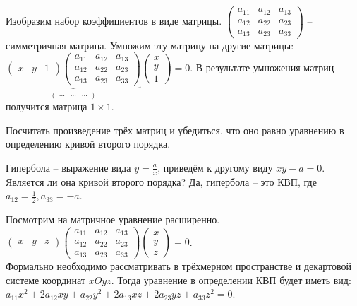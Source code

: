   Изобразим набор коэффициентов в виде матрицы.
  $\left( \begin{array}{cccc}
    a_{11} & a_{12} & a_{13}\\
    a_{12} & a_{22} & a_{23} \\
    a_{13} & a_{23} & a_{33}
    \end{array}\right)$ -- симметричная матрица.
  Умножим эту матрицу  на другие матрицы:
  $\underbrace{\left( \begin{array}{cccc}
    x & y & 1
    \end{array}\right)
  \left( \begin{array}{cccc}
    a_{11} & a_{12} & a_{13}\\
    a_{12} & a_{22} & a_{23} \\
    a_{13} & a_{23} & a_{33}
    \end{array}\right)}_
      {\left( \begin{array}{cccc}
      ... & ... & ... 
      \end{array}\right)}
  \left( \begin{array}{cccc}
    x \\
    y \\
    1
    \end{array}\right) = 0 $. В результате умножения матриц получится матрица $1 \times 1$.

  \begin{Ex}
    Посчитать произведение трёх матриц и убедиться, что оно равно уравнению в определению кривой второго порядка.
  \end{Ex}

  \begin{Example}
    Гипербола -- выражение вида $y = \frac{a}{x}$, приведём к другому виду $xy - a = 0$. Является ли она кривой второго порядка? Да, гипербола -- это КВП, где $a_{12} = \frac{1}{2}, a_{33} = -a$.
  \end{Example}


  Посмотрим на матричное уравнение расширенно. $\left( \begin{array}{cccc}
    x & y & z
    \end{array}\right)
  \left( \begin{array}{cccc}
    a_{11} & a_{12} & a_{13}\\
    a_{12} & a_{22} & a_{23} \\
    a_{13} & a_{23} & a_{33}
    \end{array}\right)
  \left( \begin{array}{cccc}
    x \\
    y \\
    z
    \end{array}\right) = 0$.\\ Формально необходимо рассматривать в трёхмерном пространстве и декартовой системе координат $xOyz$.
  Тогда уравнение в определении КВП будет иметь вид: \\
  $a_{11} x^2 + 2 a_{12}xy + a_{22} y^2 + 2 a_{13}xz + 2 a_{23}yz + a_{33}z^2 = 0$.

